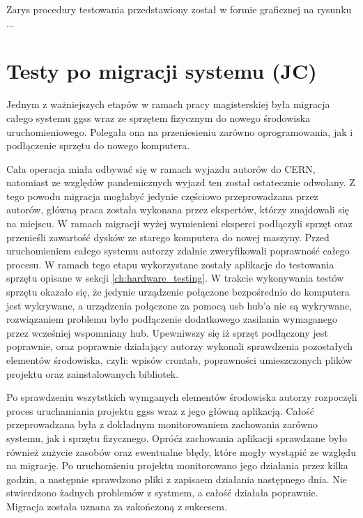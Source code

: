  Zarys procedury testowania przedstawiony został w formie graficznej na rysunku ... 


\section{Testy po migracji systemu (JC)}

Jednym z ważniejszych etapów w ramach pracy magisterskiej była migracja całego systemu ggss wraz ze sprzętem fizycznym do nowego środowiska uruchomieniowego. Polegała ona na przeniesieniu zarówno oprogramowania, jak i podłączenie sprzętu do nowego komputera.

Cała operacja miała odbywać się w ramach wyjazdu autorów do CERN, natomiast ze względów pandemicznych wyjazd ten został ostatecznie odwołany. Z tego powodu migracja mogłabyć jedynie częściowo przeprowadzana przez autorów, główną praca została wykonana przez ekspertów, którzy znajdowali się na miejscu. W ramach migracji wyżej wymienieni eksperci podłączyli sprzęt oraz przenieśli zawartość dysków ze starego komputera do nowej maszyny. Przed uruchomieniem całego systemu autorzy zdalnie zweryfikowali poprawność całego procesu. W ramach tego etapu wykorzystane zostały aplikacje do testowania sprzętu opisane w sekcji \ref{ch:hardware_testing}. W trakcie wykonywania testów sprzętu okazało się, że jedynie urządzenie połączone bezpośrednio do komputera jest wykrywane, a urządzenia połączone za pomocą usb hub'a nie są wykrywane, rozwiązaniem problemu było podłączenie dodatkowego zasilania wymaganego przez wcześniej wspomniany hub. Upewniwszy się iż sprzęt podłączony jest poprawnie, oraz poprawnie działający autorzy wykonali sprawdzenia pozostałych elementów środowiska, czyli: wpisów crontab, poprawności umieszczonych plików projektu oraz zainstalowanych bibliotek.

Po sprawdzeniu wszytstkich wymganych elementów środowiska autorzy rozpoczęli proces uruchamiania projektu ggss wraz z jego główną aplikacją. Całość przeprowadzana była z dokładnym monitorowaniem zachowania zarówno systemu, jak i sprzętu fizycznego. Opróćz zachowania aplikacji sprawdzane było również zużycie zasobów oraz ewentualne błędy, które mogły wystąpić ze względu na migrację. Po uruchomieniu projektu monitorowano jego działania przez kilka godzin, a następnie sprawdzono pliki z zapisaem działania następnego dnia. Nie stwierdzono żadnych problemów z systmem, a całość działała poprawnie. Migracja została uznana za zakończoną z sukcesem.

